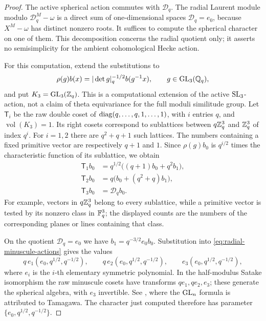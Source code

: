 \begin{proof}
The active spherical action commutes with \(\mathcal D_q\).
The radial Laurent module modulo \(\mathcal D_q^M-\omega\)
is a direct sum of one-dimensional spaces
\(\mathcal D_q=e_0\), because \(X^M-\omega\) has distinct
nonzero roots.  It suffices to compute the spherical character
on one of them.  This decomposition concerns the radial
quotient only; it asserts no semisimplicity for the ambient
cohomological Hecke action.

For this computation, extend the substitutions to
\[
\rho(g)b(x)=|\det g|_q^{-1/2}b(g^{-1}x),
\qquad g\in\operatorname{GL}_3(\mathbb{Q}_q),
\]
and put \(K_3=\operatorname{GL}_3(\mathbb{Z}_q)\).  This is a computational extension
of the active \(\operatorname{SL}_3\)-action, not a claim of theta equivariance
for the full moduli similitude group.  Let \(\mathsf T_i\) be
the raw double coset of
\(\operatorname{diag}(q,\ldots,q,1,\ldots,1)\), with \(i\) entries \(q\),
and \(\operatorname{vol}(K_3)=1\).  Its right cosets correspond
to sublattices between \(q\mathbb{Z}_q^3\) and \(\mathbb{Z}_q^3\) of index
\(q^i\).  For \(i=1,2\) there are \(q^2+q+1\) such lattices.
The numbers containing a fixed primitive vector are respectively
\(q+1\) and \(1\).  Since \(\rho(g)b_0\) is
\(q^{i/2}\) times the characteristic function of its sublattice,
we obtain
\begin{equation}\label{eq:radial-minuscule-actions}
\begin{aligned}
\mathsf T_1b_0&=q^{1/2}\bigl((q+1)b_0+q^2b_1\bigr),\\
\mathsf T_2b_0&=q\bigl(b_0+(q^2+q)b_1\bigr),\\
\mathsf T_3b_0&=\mathcal D_qb_0.
\end{aligned}
\end{equation}
For example, vectors in \(q\mathbb{Z}_q^3\) belong to every sublattice,
while a primitive vector is tested by its nonzero class in
\(\mathbb{F}_q^3\); the displayed counts are the numbers of the
corresponding planes or lines containing that class.

On the quotient \(\mathcal D_q=e_0\) we have
\(b_1=q^{-3/2}e_0b_0\).  Substitution into
\eqref{eq:radial-minuscule-actions} gives the values
\[
q\,e_1(e_0,q^{1/2},q^{-1/2}),\qquad
q\,e_2(e_0,q^{1/2},q^{-1/2}),\qquad
e_3(e_0,q^{1/2},q^{-1/2}),
\]
where \(e_i\) is the \(i\)-th elementary symmetric polynomial.
In the half-modulus Satake isomorphism the raw minuscule cosets
have transforms \(q e_1,q e_2,e_3\); these generate the spherical
algebra, with \(e_3\) invertible.  See
\cite[Equation~(3.14) and \S6]{Gross1998}, where the
\(\operatorname{GL}_n\) formula is attributed to Tamagawa.  The character just
computed therefore has parameter
\(\{e_0,q^{1/2},q^{-1/2}\}\).


\end{proof}

